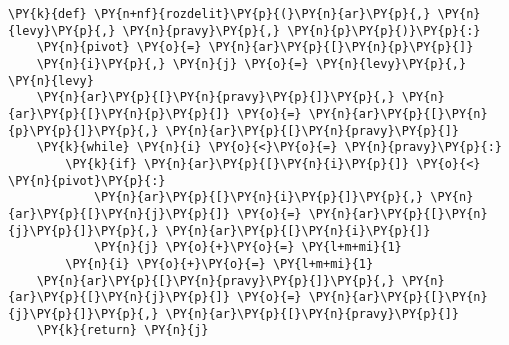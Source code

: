 \begin{Verbatim}[commandchars=\\\{\}]
\PY{k}{def} \PY{n+nf}{rozdelit}\PY{p}{(}\PY{n}{ar}\PY{p}{,} \PY{n}{levy}\PY{p}{,} \PY{n}{pravy}\PY{p}{,} \PY{n}{p}\PY{p}{)}\PY{p}{:}
	\PY{n}{pivot} \PY{o}{=} \PY{n}{ar}\PY{p}{[}\PY{n}{p}\PY{p}{]}
	\PY{n}{i}\PY{p}{,} \PY{n}{j} \PY{o}{=} \PY{n}{levy}\PY{p}{,} \PY{n}{levy}
	\PY{n}{ar}\PY{p}{[}\PY{n}{pravy}\PY{p}{]}\PY{p}{,} \PY{n}{ar}\PY{p}{[}\PY{n}{p}\PY{p}{]} \PY{o}{=} \PY{n}{ar}\PY{p}{[}\PY{n}{p}\PY{p}{]}\PY{p}{,} \PY{n}{ar}\PY{p}{[}\PY{n}{pravy}\PY{p}{]}
	\PY{k}{while} \PY{n}{i} \PY{o}{<}\PY{o}{=} \PY{n}{pravy}\PY{p}{:}
		\PY{k}{if} \PY{n}{ar}\PY{p}{[}\PY{n}{i}\PY{p}{]} \PY{o}{<} \PY{n}{pivot}\PY{p}{:}
			\PY{n}{ar}\PY{p}{[}\PY{n}{i}\PY{p}{]}\PY{p}{,} \PY{n}{ar}\PY{p}{[}\PY{n}{j}\PY{p}{]} \PY{o}{=} \PY{n}{ar}\PY{p}{[}\PY{n}{j}\PY{p}{]}\PY{p}{,} \PY{n}{ar}\PY{p}{[}\PY{n}{i}\PY{p}{]}
			\PY{n}{j} \PY{o}{+}\PY{o}{=} \PY{l+m+mi}{1}
		\PY{n}{i} \PY{o}{+}\PY{o}{=} \PY{l+m+mi}{1}
	\PY{n}{ar}\PY{p}{[}\PY{n}{pravy}\PY{p}{]}\PY{p}{,} \PY{n}{ar}\PY{p}{[}\PY{n}{j}\PY{p}{]} \PY{o}{=} \PY{n}{ar}\PY{p}{[}\PY{n}{j}\PY{p}{]}\PY{p}{,} \PY{n}{ar}\PY{p}{[}\PY{n}{pravy}\PY{p}{]}
	\PY{k}{return} \PY{n}{j}
\end{Verbatim}
